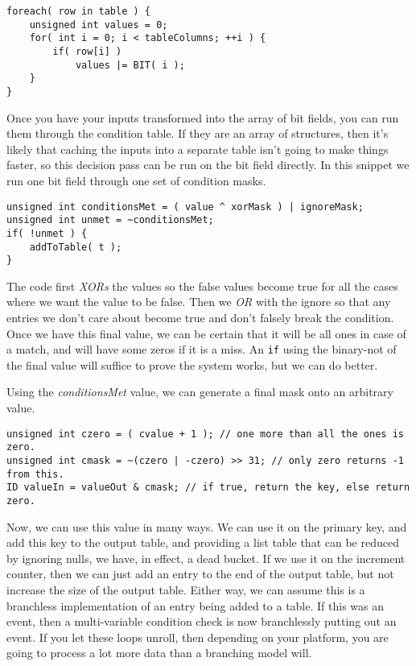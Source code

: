 \begin{lstlisting}
foreach( row in table ) {
	unsigned int values = 0;
	for( int i = 0; i < tableColumns; ++i ) {
		if( row[i] )
			values |= BIT( i );
	}
}
\end{lstlisting}

Once you have your inputs transformed into the array of bit fields, you can run
them through the condition table. If they are an array of structures, then it's
likely that caching the inputs into a separate table isn't going to make things
faster, so this decision pass can be run on the bit field directly. In this snippet
we run one bit field through one set of condition masks.

\begin{lstlisting}
unsigned int conditionsMet = ( value ^ xorMask ) | ignoreMask;
unsigned int unmet = ~conditionsMet;
if( !unmet ) {
	addToTable( t );
}
\end{lstlisting}

The code first {\em XORs} the values so the false values become true for all
the cases where we want the value to be false. Then we {\em OR} with the ignore
so that any entries we don't care about become true and don't falsely break the
condition. Once we have this final value, we can be certain that it will be all
ones in case of a match, and will have some zeros if it is a miss.  An {\tt if}
using the binary-not of the final value will suffice to prove the system works,
but we can do better.

Using the {\em conditionsMet} value, we can generate a final mask onto an
arbitrary value. 

\begin{lstlisting}
unsigned int czero = ( cvalue + 1 ); // one more than all the ones is zero.
unsigned int cmask = ~(czero | -czero) >> 31; // only zero returns -1 from this.
ID valueIn = valueOut & cmask; // if true, return the key, else return zero.
\end{lstlisting}

Now, we can use this value in many ways. We can use it on the primary key, and
add this key to the output table, and providing a list table that can be
reduced by ignoring nulls, we have, in effect, a dead bucket. If we use it on
the increment counter, then we can just add an entry to the end of the output
table, but not increase the size of the output table. Either way, we can assume
this is a branchless implementation of an entry being added to a table. If this
was an event, then a multi-variable condition check is now branchlessly putting
out an event. If you let these loops unroll, then depending on your platform, you
are going to process a lot more data than a branching model will.
